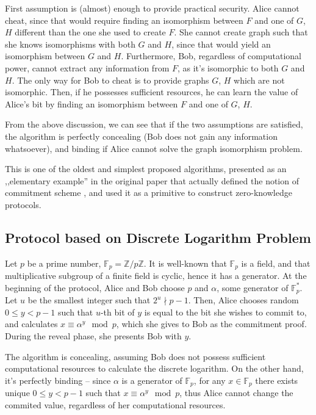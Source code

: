\documentclass[10pt]{article}
\begin{document}
First assumption is (almost) enough to provide practical security. Alice cannot cheat, since that would
require finding an isomorphism between \(F\) and one of \(G\), \(H\) different than the one she used to
create \(F\). She cannot create graph such that she knows isomorphisms with both \(G\) and \(H\), since
that would yield an isomorphism between \(G\) and \(H\). Furthermore, Bob, regardless of computational
power, cannot extract any information from \(F\), as it's isomorphic to both \(G\) and \(H\). The only 
way for Bob to cheat is to provide graphs \(G\), \(H\) which are not isomorphic. Then, if he possesses
sufficient resources, he can learn the value of Alice's bit by finding an isomorphism between \(F\) and
one of \(G\), \(H\).

From the above discussion, we can see that if the two assumptions are satisfied, the algorithm is
perfectly concealing (Bob does not gain any information whatsoever), and binding if Alice cannot solve
the graph isomorphism problem.

This is one of the oldest and simplest proposed algorithms, presented as an ,,elementary example'' 
in the original paper that actually defined the notion of commitment scheme \cite{Brassard88}, and 
used it as a primitive to construct zero-knowledge protocols.

\subsection{Protocol based on Discrete Logarithm Problem}

Let \(p\) be a prime number, \(\mathbb{F}_p=\mathbb{Z}/p\mathbb{Z}\). It is well-known that 
\(\mathbb{F}_p\) is a field, and that multiplicative subgroup of a finite field is cyclic, hence it
has a generator. At the beginning of the protocol, Alice and Bob choose \(p\) and \(\alpha\), some
generator of \(\mathbb{F}^*_p\). Let \(u\) be the smallest integer such that \(2^u \nmid p-1\). 
Then, Alice chooses random \(0\leq y < p-1\) such that \(u\)-th bit of \(y\) is equal to the bit
she wishes to commit to\footnotemark, and calculates \(x\equiv \alpha^y \mod p\), which she gives
to Bob as the commitment proof. During the reveal phase, she presents Bob with \(y\).

The algorithm is concealing, assuming Bob does not possess sufficient computational resources to
calculate the discrete logarithm. On the other hand, it's perfectly binding -- since \(\alpha\) is
a generator of \(\mathbb{F}_p\), for any \(x\in\mathbb{F}_p\) there exists unique \(0\leq y < p-1\)
such that \(x\equiv \alpha^y \mod p\), thus Alice cannot change the commited value, regardless
of her computational resources.
\end{document}
